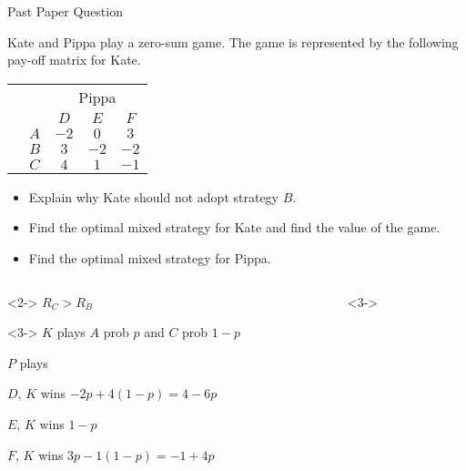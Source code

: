 \documentclass[8pt]{beamer}
\begin{document}
\begin{frame}[shrink=10]{Past Paper Question}
\begin{problem}
	Kate and Pippa play a zero-sum game. The game is represented by the following pay-off matrix for Kate.

			\begin{center}	
			\colorbox{cc}{
  \setlength\arrayrulewidth{0.5mm}
	\begin{tabular}{cc|ccc}
\multicolumn{2}{c}{} & \multicolumn{3}{c}{Pippa}\\
\multicolumn{1}{c}{} &  & $D$  & $E$ & $ F$ \\ \hline 
\raisebox{0cm}{\multirow{3}*{\rotatebox{90}{Kate}}}  & $A$ & $-2$ & $0$ & $3$ \\
						     & $B$ & $3$ & $-2$ & $-2$ \\
						     & $C$ & $4$ & $1$ & $-1$ \\
\end{tabular}}
\end{center}

\begin{itemize}
	\item Explain why Kate should not adopt strategy $B$.
	\item Find the optimal mixed strategy for Kate and find the value of the game.
	\item Find the optimal mixed strategy for Pippa.
\end{itemize}
\end{problem}	

\begin{columns}[T]
\begin{column}{.3\linewidth}
\begin{solution}<2->
	$R_C>R_B$
\end{solution}
\begin{solution}<3->
	$K$ plays  $A$ prob  $p$ and  $C$ prob  $1-p$

	 $P$ plays 

	 $D$,  $K$ wins  $-2p+4(1-p)=4-6p$

	  $E$,  $K$ wins  $1-p$

	  $F$,  $K$ wins  $3p-1(1-p)=-1+4p$
\end{solution}
\end{column}
\begin{column}{.4\linewidth}
\begin{solution}<3->
	

\end{solution}
\end{column}
\end{columns}
\end{frame}
\end{document}
